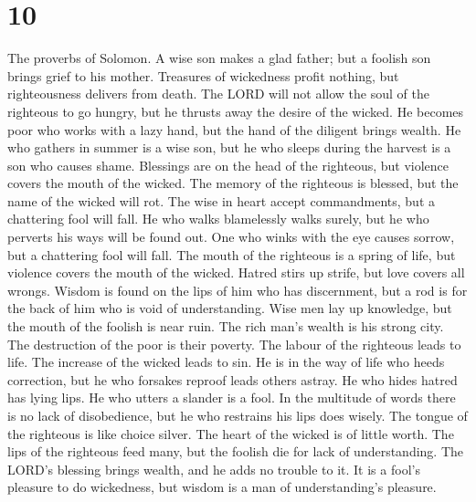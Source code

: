 \hypertarget{section-9}{%
\section{10}\label{section-9}}

 The proverbs of Solomon. A wise son makes a glad father;
but a foolish son brings grief to his mother.  Treasures
of wickedness profit nothing, but righteousness delivers from death.
 The LORD will not allow the soul of the righteous to go
hungry, but he thrusts away the desire of the wicked.  He
becomes poor who works with a lazy hand, but the hand of the diligent
brings wealth.  He who gathers in summer is a wise son,
but he who sleeps during the harvest is a son who causes shame.
 Blessings are on the head of the righteous, but violence
covers the mouth of the wicked.  The memory of the
righteous is blessed, but the name of the wicked will rot.
 The wise in heart accept commandments, but a chattering
fool will fall.  He who walks blamelessly walks surely,
but he who perverts his ways will be found out.  One who
winks with the eye causes sorrow, but a chattering fool will fall.
 The mouth of the righteous is a spring of life, but
violence covers the mouth of the wicked.  Hatred stirs up
strife, but love covers all wrongs.  Wisdom is found on
the lips of him who has discernment, but a rod is for the back of him
who is void of understanding.  Wise men lay up knowledge,
but the mouth of the foolish is near ruin.  The rich
man's wealth is his strong city. The destruction of the poor is their
poverty.  The labour of the righteous leads to life. The
increase of the wicked leads to sin.  He is in the way of
life who heeds correction, but he who forsakes reproof leads others
astray.  He who hides hatred has lying lips. He who
utters a slander is a fool.  In the multitude of words
there is no lack of disobedience, but he who restrains his lips does
wisely.  The tongue of the righteous is like choice
silver. The heart of the wicked is of little worth.  The
lips of the righteous feed many, but the foolish die for lack of
understanding.  The LORD's blessing brings wealth, and he
adds no trouble to it.  It is a fool's pleasure to do
wickedness, but wisdom is a man of understanding's pleasure.
